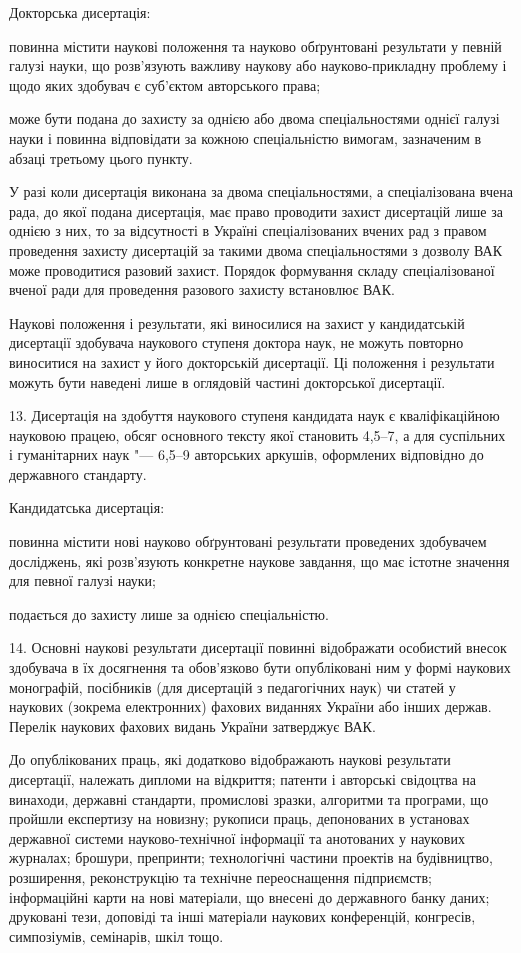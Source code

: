 \documentclass[
]{mon2017dev-aref}[2021/07/21]
\theoremstyle{plain}
\theoremstyle{definition}
\theoremstyle{remark}
\begin{document}
Докторська дисертація:

повинна містити наукові положення та науково обґрунтовані
результати у певній галузі науки, що розв'язують важливу наукову
або науково-прикладну проблему і щодо яких здобувач є суб'єктом
авторського права;

може бути подана до захисту за однією або двома спеціальностями
однієї галузі науки і повинна відповідати за кожною спеціальністю
вимогам, зазначеним в абзаці третьому цього пункту.

У разі коли дисертація виконана за двома спеціальностями, а
спеціалізована вчена рада, до якої подана дисертація, має право
проводити захист дисертацій лише за однією з них, то за
відсутності в Україні спеціалізованих вчених рад з правом
проведення захисту дисертацій за такими двома спеціальностями з
дозволу ВАК може проводитися разовий захист. Порядок формування
складу спеціалізованої вченої ради для проведення разового захисту
встановлює ВАК.

Наукові положення і результати, які виносилися на захист у
кандидатській дисертації здобувача наукового ступеня доктора наук,
не можуть повторно виноситися на захист у його докторській
дисертації. Ці положення і результати можуть бути наведені лише в
оглядовій частині докторської дисертації.

13. Дисертація на здобуття наукового ступеня кандидата наук є
кваліфікаційною науковою працею, обсяг основного тексту якої
становить 4,5--7, а для суспільних і гуманітарних наук "--- 6,5--9
авторських аркушів, оформлених відповідно до державного стандарту.

Кандидатська дисертація:

повинна містити нові науково обґрунтовані результати проведених
здобувачем досліджень, які розв'язують конкретне наукове завдання,
що має істотне значення для певної галузі науки;

подається до захисту лише за однією спеціальністю.

14. Основні наукові результати дисертації повинні відображати
особистий внесок здобувача в їх досягнення та обов'язково бути
опубліковані ним у формі наукових монографій, посібників (для
дисертацій з педагогічних наук) чи статей у наукових (зокрема
електронних) фахових виданнях України або інших держав. Перелік
наукових фахових видань України затверджує ВАК.

До опублікованих праць, які додатково відображають наукові
результати дисертації, належать дипломи на відкриття; патенти і
авторські свідоцтва на винаходи, державні стандарти, промислові
зразки, алгоритми та програми, що пройшли експертизу на новизну;
рукописи праць, депонованих в установах державної системи
науково-технічної інформації та анотованих у наукових журналах;
брошури, препринти; технологічні частини проектів на будівництво,
розширення, реконструкцію та технічне переоснащення підприємств;
інформаційні карти на нові матеріали, що внесені до державного
банку даних; друковані тези, доповіді та інші матеріали наукових
конференцій, конгресів, симпозіумів, семінарів, шкіл тощо.
\end{document}
